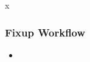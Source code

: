 x\documentclass{article}
\begin{document}
\subsubsection{Fixup Workflow}
\begin{itemize}
\item 
\end{itemize}
\end{document}
